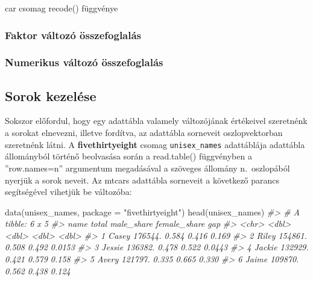 \documentclass[
]{book}
\newenvironment{Shaded}{\begin{snugshade}}{\end{snugshade}}
\newcommand{\AttributeTok}[1]{\textcolor[rgb]{0.77,0.63,0.00}{#1}}
\newcommand{\CommentTok}[1]{\textcolor[rgb]{0.56,0.35,0.01}{\textit{#1}}}
\newcommand{\FunctionTok}[1]{\textcolor[rgb]{0.00,0.00,0.00}{#1}}
\newcommand{\NormalTok}[1]{#1}
\newcommand{\StringTok}[1]{\textcolor[rgb]{0.31,0.60,0.02}{#1}}
\begin{document}
car csomag recode() függvénye

\hypertarget{faktor-vuxe1ltozuxf3-uxf6sszefoglaluxe1s}{%
\subsubsection{Faktor változó összefoglalás}\label{faktor-vuxe1ltozuxf3-uxf6sszefoglaluxe1s}}

\hypertarget{numerikus-vuxe1ltozuxf3-uxf6sszefoglaluxe1s}{%
\subsubsection{Numerikus változó összefoglalás}\label{numerikus-vuxe1ltozuxf3-uxf6sszefoglaluxe1s}}

\hypertarget{sorok-kezeluxe9se}{%
\subsection{Sorok kezelése}\label{sorok-kezeluxe9se}}

Sokszor előfordul, hogy egy adattábla valamely változójának értékeivel szeretnénk a sorokat elnevezni, illetve fordítva, az adattábla sorneveit oszlopvektorban szeretnénk látni. A \textbf{fivethirtyeight} csomag \texttt{unisex\_names} adattáblája adattábla állományból történő beolvasása során a read.table() függvényben a ''row.names=n'' argumentum megadásával a szöveges állomány n.~oszlopából nyerjük a sorok neveit.
Az mtcars adattábla sorneveit a következő parancs segítségével vihetjük be változóba:

\begin{Shaded}
\begin{Highlighting}[]
\FunctionTok{data}\NormalTok{(unisex\_names, }\AttributeTok{package =} \StringTok{"fivethirtyeight"}\NormalTok{)}
\FunctionTok{head}\NormalTok{(unisex\_names)}
\CommentTok{\#\textgreater{} \# A tibble: 6 x 5}
\CommentTok{\#\textgreater{}   name     total male\_share female\_share    gap}
\CommentTok{\#\textgreater{}   \textless{}chr\textgreater{}    \textless{}dbl\textgreater{}      \textless{}dbl\textgreater{}        \textless{}dbl\textgreater{}  \textless{}dbl\textgreater{}}
\CommentTok{\#\textgreater{} 1 Casey  176544.      0.584        0.416 0.169 }
\CommentTok{\#\textgreater{} 2 Riley  154861.      0.508        0.492 0.0153}
\CommentTok{\#\textgreater{} 3 Jessie 136382.      0.478        0.522 0.0443}
\CommentTok{\#\textgreater{} 4 Jackie 132929.      0.421        0.579 0.158 }
\CommentTok{\#\textgreater{} 5 Avery  121797.      0.335        0.665 0.330 }
\CommentTok{\#\textgreater{} 6 Jaime  109870.      0.562        0.438 0.124}
\end{Highlighting}
\end{Shaded}
\end{document}
